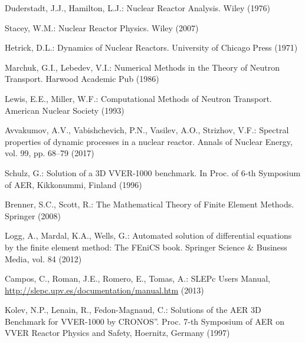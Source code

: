 \documentclass[runningheads,a4paper]{llncs}
\begin{document}
\begin{thebibliography}{12}
Duderstadt, J.J., Hamilton, L.J.: Nuclear Reactor Analysis. Wiley (1976)

Stacey, W.M.: Nuclear Reactor Physics. Wiley (2007)

Hetrick, D.L.: Dynamics of Nuclear Reactors. University of Chicago Press (1971)

Marchuk, G.I., Lebedev, V.I.: Numerical Methods in the Theory of Neutron Transport. Harwood Academic Pub  (1986)

Lewis, E.E., Miller, W.F.: Computational Methods of Neutron Transport. American Nuclear Society (1993)

Avvakumov, A.V., Vabishchevich, P.N., Vasilev, A.O., Strizhov, V.F.: Spectral properties of dynamic processes in a nuclear reactor. Annals of Nuclear Energy, vol. 99, pp. 68--79 (2017)

Schulz, G.: Solution of a 3D VVER-1000 benchmark. In Proc. of 6-th Symposium of AER, Kikkonummi, Finland (1996)

Brenner, S.C., Scott, R.: The Mathematical Theory of Finite Element Methods. Springer (2008)

Logg, A., Mardal, K.A., Wells, G.: Automated solution of differential equations by the finite element method: The FEniCS book. Springer Science \& Business Media, vol. 84 (2012)

Campos, C., Roman, J.E., Romero, E., Tomas, A.: SLEPc Users Manual, \url{http://slepc.upv.es/documentation/manual.htm} (2013)

Kolev, N.P., Lenain, R., Fedon-Magnaud, C.: Solutions of the AER 3D Benchmark for VVER-1000 by CRONOS”. Proc. 7-th Symposium of AER on VVER Reactor Physics and Safety, Hoernitz, Germany (1997)
  
\end{thebibliography}
\end{document}
